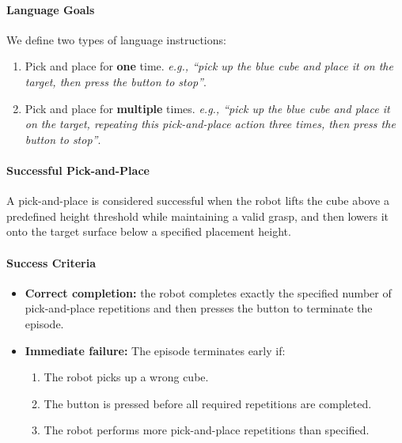 \paragraph{Language Goals}
We define two types of language instructions:
\begin{enumerate}[itemsep=1pt, topsep=0pt, leftmargin=*]
    \item Pick and place for \textbf{one} time. 
    \textit{e.g., ``pick up the blue cube and place it on the target, then press the button to stop''}.
    
    \item Pick and place for \textbf{multiple} times.
    \textit{e.g., ``pick up the blue cube and place it on the target, repeating this pick-and-place action three times, then press the button to stop''}.

\end{enumerate}


\paragraph{Successful Pick-and-Place} A pick-and-place is considered successful when the robot lifts the cube above a predefined height threshold while maintaining a valid grasp, and then lowers it onto the target surface below a specified placement height.



\paragraph{Success Criteria}
\begin{itemize}[itemsep=1pt, topsep=0pt, leftmargin=*]
    \item \textbf{Correct completion:} the robot completes exactly the specified number of pick-and-place repetitions and then presses the button to terminate the episode.
    \item \textbf{Immediate failure:} The episode terminates early if:
        \begin{enumerate}[itemsep=1pt, topsep=0pt, leftmargin=*]
            \item The robot picks up a wrong cube.
            \item The button is pressed before all required repetitions are completed.
            \item The robot performs more pick-and-place repetitions than specified.
        \end{enumerate}
\end{itemize}

